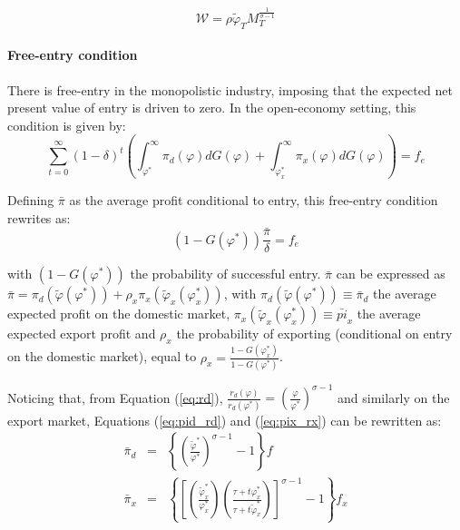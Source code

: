 \documentclass[a4paper,11pt]{article}
\begin{document}
\begin{equation}
\mathcal{W} = \rho \widetilde{\varphi}_T M_T^{\frac{1}{\sigma-1}}\label{eq:Welfare}
\end{equation}



\paragraph{Free-entry condition} There is free-entry in the monopolistic industry, imposing that the expected net present value of entry is driven to zero. In the open-economy setting, this condition is given by:
\begin{equation*}
  \sum_{t=0}^{\infty}(1-\delta)^t \left(\int_{\varphi^\ast}^{\infty} \pi_d(\varphi )dG(\varphi) + \int_{\varphi_x^\ast}^{\infty} \pi_x(\varphi )dG(\varphi)  \right) = f_e
\end{equation*}

Defining $\bar{\pi}$ as the average profit conditional to entry, this free-entry condition rewrites as:
\begin{equation}
\left(1-G(\varphi^\ast)\right)\frac{\bar{\pi}}{\delta} = f_e \label{eq:FEC}
\end{equation}


\noindent with $\left(1-G(\varphi^\ast)\right)$ the probability of successful entry. $\bar{\pi}$ can be expressed as $\bar{\pi} =\pi_d(\widetilde{\varphi}(\varphi^\ast)) + \rho_x \pi_x(\widetilde{\varphi}_x(\varphi_x^\ast))$, with $\pi_d(\widetilde{\varphi}(\varphi^\ast)) \equiv \bar{\pi}_d$ the average expected profit on the domestic market, $\pi_x(\widetilde{\varphi}_x(\varphi_x^\ast))\equiv \bar{pi}_x$ the average expected export profit and $\rho_x$ the probability of exporting (conditional on entry on the domestic market), equal to $\rho_x = \frac{1-G(\varphi_x^\ast)}{1-G(\varphi^\ast)}$.

Noticing that, from Equation (\ref{eq:rd}), $\frac{r_d(\varphi)}{r_d(\varphi^\ast)} = \left( \frac{\varphi}{\varphi^\ast} \right)^{\sigma-1}$ and similarly on the export market, Equations (\ref{eq:pid_rd}) and (\ref{eq:pix_rx}) can be rewritten as:
\begin{eqnarray*}
\bar{\pi}_d &=& \left\{\left(\frac{\widetilde{\varphi}^\ast}{\varphi^\ast}\right)^{\sigma-1}-1 \right\}f \\
\bar{\pi}_x &=& \left\{\left[\left(\frac{\widetilde{\varphi}_x^\ast}{\varphi_x^\ast}\right)\left(\frac{\tau+ t \varphi^\ast_x}{\tau+ t \widetilde{\varphi}^\ast_x}\right)\right]^{\sigma-1}-1 \right\}f_x
\end{eqnarray*}
\end{document}
